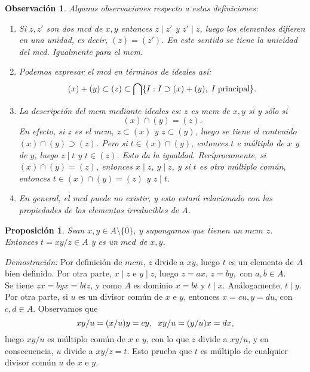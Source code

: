 \documentclass[12pt]{article}
\newtheorem{proposition}[theorem]{Proposición}
\newtheorem{observation}{Observación}[theorem]
\begin{document}
\begin{observation}\label{eq:obs} Algunas observaciones respecto a estas definiciones: \begin{enumerate}
\item Si $z, z'$ son dos mcd de $x,y$ entonces $z \mid z'$ y $z' \mid z$, luego los elementos difieren en una unidad, es decir, $(z) = (z')$. En este sentido se tiene la unicidad del mcd. Igualmente para el mcm.
\item Podemos expresar el mcd en términos de ideales así: $$(x) + (y) \subset (z) \subset \bigcap \lbrace I : I\supset (x) +(y), \hspace{0.1cm} I \hspace{0.1cm} \text{principal}\rbrace.$$
\item La descripción del mcm mediante ideales es: $z$ es mcm de $x,y$ si y sólo si $$(x) \cap (y) = (z).$$ En efecto, si $z$ es el mcm, $z \subset (x)$ y $z \subset (y)$, luego se tiene el contenido $(x) \cap (y) \supset (z)$. Pero si $t \in (x) \cap (y)$, entonces $t$ e múltiplo de $x$ y de $y$, luego $z \mid t$ y $t \in (z)$. Esto da la igualdad. Recíprocamente, si $(x) \cap (y) = (z)$, entonces $x \mid z$, $y \mid z$, y si $t$ es otro múltiplo común, entonces $t \in (x) \cap (y) = (z)$ y $z \mid t$.
\item En general, el mcd puede no existir, y esto estará relacionado con las propiedades de los elementos irreducibles de $A$.
\end{enumerate} 
\end{observation}

\begin{proposition} \label{eq:lemdiv} Sean $x, y \in A\setminus \lbrace 0 \rbrace$, y supongamos que tienen un $mcm$ $z$. Entonces $t = xy/z \in A$ y es un $mcd$ de $x,y$.
\end{proposition}
\emph{Demostración: } Por definición de $mcm$, $z$ divide a $xy$, luego $t$ es un elemento de $A$ bien definido. Por otra parte, $x \mid z$ e $y\mid z$, luego $z = ax$, $z =by,$ con $a,b \in A.$ \vspace{0.2cm}\\
Se tiene $zx =byx = btz$, y como $A$ es dominio $x = bt$ y $t \mid x$. Análogamente, $t \mid y$. Por otra parte, si $u$ es un divisor común de $x$ e $y$, entonces $x = cu, y = du$, con $c,d \in A$. Observamos que  $$xy/u = (x/u)y = cy, \hspace{0.2cm} xy/u = (y/u)x = dx,$$ luego $xy/u$ es múltiplo común de $x$ e $y$, con lo que $z$ divide a $xy/u$, y en consecuencia, $u$ divide a $xy/z = t$. Esto prueba que $t$ es múltiplo de cualquier divisor común $u$ de $x$ e $y$.
\end{document}
